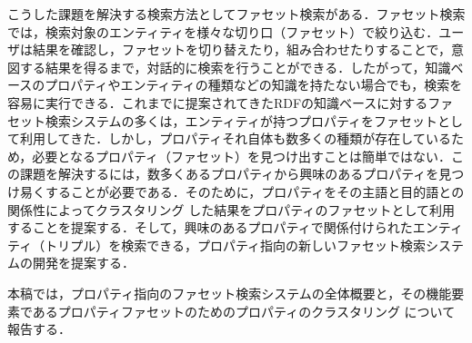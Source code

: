 こうした課題を解決する検索方法としてファセット検索がある．ファセット検索では，検索対象のエンティティを様々な切り口（ファセット）で絞り込む．ユーザは結果を確認し，ファセットを切り替えたり，組み合わせたりすることで，意図する結果を得るまで，対話的に検索を行うことができる．したがって，知識ベースのプロパティやエンティティの種類などの知識を持たない場合でも，検索を容易に実行できる．これまでに提案されてきたRDFの知識ベースに対するファセット検索システムの多くは，エンティティが持つプロパティをファセットとして利用してきた．しかし，プロパティそれ自体も数多くの種類が存在しているため，必要となるプロパティ（ファセット）を見つけ出すことは簡単ではない．この課題を解決するには，数多くあるプロパティから興味のあるプロパティを見つけ易くすることが必要である．そのために，プロパティをその主語と目的語との関係性によってクラスタリング した結果をプロパティのファセットとして利用することを提案する．そして，興味のあるプロパティで関係付けられたエンティティ（トリプル）を検索できる，プロパティ指向の新しいファセット検索システムの開発を提案する．

本稿では，プロパティ指向のファセット検索システムの全体概要と，その機能要素であるプロパティファセットのためのプロパティのクラスタリング について報告する．